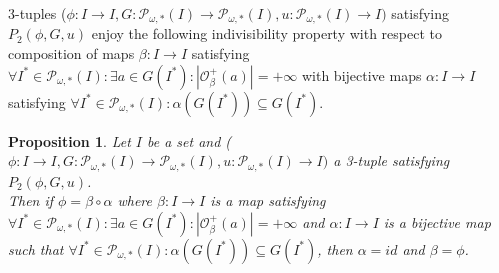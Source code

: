 \documentclass[a4paper,11pt]{article}
\theoremstyle{plain}
\newtheorem{proposition}{Proposition}[section]
\theoremstyle{definition}
\theoremstyle{remark}
\begin{document}
3-tuples ($\phi : I \to I, G : \mathcal{P}_{\omega,*}(I) \to \mathcal{P}_{\omega,*}(I), u : \mathcal{P}_{\omega,*}(I) \to I)$ satisfying $P_2(\phi,G,u)$ enjoy the following indivisibility property with respect to composition of maps $\beta : I \to I$ satisfying $\forall I^* \in \mathcal{P}_{\omega,*}(I) : \exists a \in G(I^*) : |\mathcal{O}^{+}_\beta(a)| = +\infty$ with bijective maps $\alpha : I \to I$ satisfying $\forall I^* \in \mathcal{P}_{\omega,*}(I) : \alpha(G(I^*)) \subseteq G(I^*)$.

\begin{proposition}
\label{propIrreducibilityPhiGu}
Let $I$ be a set and ($\phi : I \to I, G : \mathcal{P}_{\omega,*}(I) \to \mathcal{P}_{\omega,*}(I), u : \mathcal{P}_{\omega,*}(I) \to I)$ a 3-tuple satisfying $P_2(\phi,G,u)$. \\
Then if $\phi = \beta \circ \alpha$ where $\beta : I \to I$ is a map satisfying $\forall I^* \in \mathcal{P}_{\omega,*}(I) : \exists a \in G(I^*) : |\mathcal{O}^{+}_\beta(a)| = +\infty$ and $\alpha : I \to I$ is a bijective map such that $\forall I^* \in \mathcal{P}_{\omega,*}(I) : \alpha(G(I^*)) \subseteq G(I^*)$, then $\alpha = id$ and $\beta = \phi$.
\end{proposition}
\end{document}
